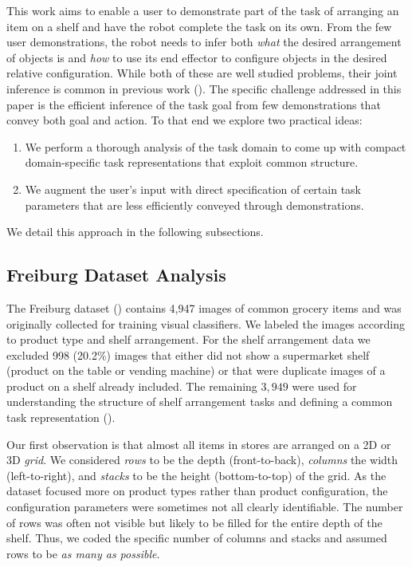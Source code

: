 This work aims to enable a user to demonstrate part of the task of arranging an item on a shelf and have the robot complete the task on its own.
From the few user demonstrations, the robot needs to infer both {\em what} the desired arrangement of objects is and {\em how} to use its end effector to configure objects in the desired relative configuration. While both of these are well studied problems, their joint inference is common in previous work (\eg \cite{akgun2016simultaneously}). The specific challenge addressed in this paper is the efficient inference of the task goal from few demonstrations that convey both goal and action. To that end we explore two practical ideas:
\begin{enumerate}
	\item We perform a thorough analysis of the task domain to come up with compact domain-specific task representations that exploit common structure.
	\item We augment the user's input with direct specification of certain task parameters that are less efficiently conveyed through demonstrations. 
\end{enumerate}

We detail this approach in the following subsections.

\subsection{Freiburg Dataset Analysis}
\label{sec:irosdata-analysis}

The Freiburg dataset (\cite{jund2016freiburg}) contains 4,947 images of common grocery items and was originally collected for training visual classifiers.
We labeled the images according to product type and shelf arrangement. For the shelf arrangement data we excluded 998 (20.2\%) images that either did not show a supermarket shelf (\eg product on the table or vending machine) or that were duplicate images of a product on a shelf already included.
The remaining $3,949$ were used for understanding the structure of shelf arrangement tasks and defining a common task representation ().

Our first observation is that almost all items in stores are arranged on a 2D or 3D {\em grid}.
We considered \textit{rows} to be the depth (front-to-back), \textit{columns} the width (left-to-right), and \textit{stacks} to be the height (bottom-to-top) of the grid.
As the dataset focused more on product types rather than product configuration, the configuration parameters were sometimes not all clearly identifiable.
The number of rows was often not visible but likely to be filled for the entire depth of the shelf.
Thus, we coded the specific number of columns and stacks and assumed rows to be \textit{as many as possible}.

